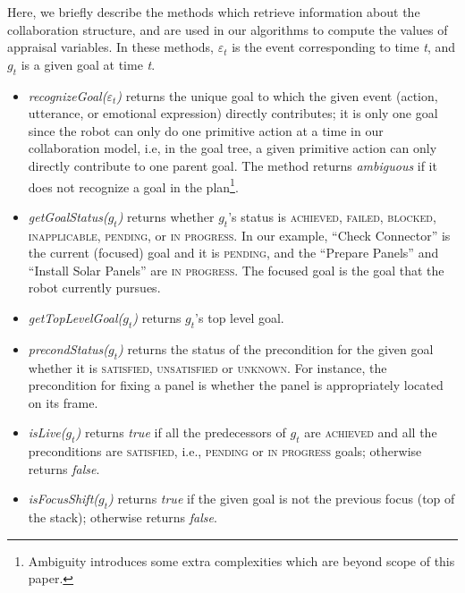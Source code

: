 \documentclass[12pt]{report}
\begin{document}
Here, we briefly describe the methods which retrieve information about the
collaboration structure, and are used in our algorithms to compute the values of
appraisal variables. In these methods, $\varepsilon_t$ is the event
corresponding to time \textit{t}, and $g_t$ is a given goal at time \textit{t}.

\begin{itemize}
  \setlength\itemsep{1mm}
  \item \textit{recognizeGoal($\varepsilon_t$)} returns the unique goal to which
  the given event (action, utterance, or emotional expression) directly
  contributes; it is only one goal since the robot can only do one primitive
  action at a time in our collaboration model, i.e, in the goal tree, a given
  primitive action can only directly contribute to one parent goal. The method
  returns \textit{ambiguous} if it does not recognize a goal in the
  plan\footnote{Ambiguity introduces some extra complexities which are beyond
  scope of this paper.}.
  
  \item \textit{getGoalStatus($g_t$)} returns whether $g_t$'s status is
  \textsc{achieved, failed, blocked, inapplicable, pending,} or \textsc{in
  progress}. In our example, ``Check Connector'' is the current (focused) goal
  and it is \textsc{pending}, and the ``Prepare Panels'' and ``Install Solar
  Panels'' are \textsc{in progress}. The focused goal is the goal that the robot
  currently pursues.
  
  \item \textit{getTopLevelGoal($g_t$)} returns $g_t$'s top level goal.

  \item \textit{precondStatus($g_t$)} returns the status of the precondition for
  the given goal whether it is \textsc{satisfied, unsatisfied} or
  \textsc{unknown}. For instance, the precondition for fixing a panel is whether
  the panel is appropriately located on its frame.
  
  \item \textit{isLive($g_t$)} returns \textit{true} if all the predecessors of
  $g_t$ are \textsc{achieved} and all the preconditions are \textsc{satisfied},
  i.e., \textsc{pending} or \textsc{in progress} goals; otherwise returns
  \textit{false}.
  
  \item \textit{isFocusShift($g_t$)} returns \textit{true} if the given
  goal is not the previous focus (top of the stack); otherwise returns
  \textit{false}.
  

\end{itemize}
\end{document}
